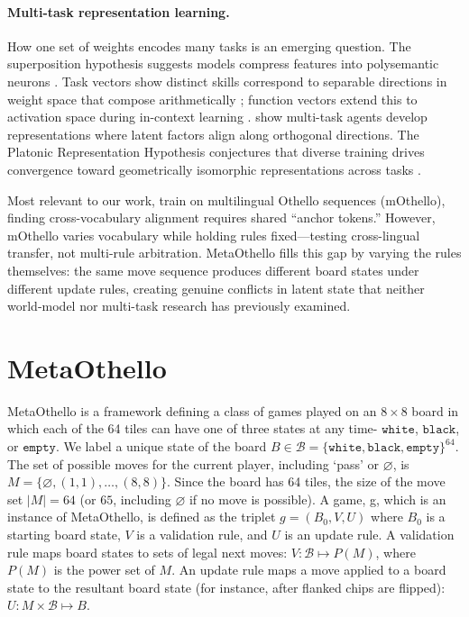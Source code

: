\documentclass{article}
\theoremstyle{plain}
\theoremstyle{definition}
\theoremstyle{remark}
\begin{document}
\paragraph{Multi-task representation learning.} How one set of weights encodes many tasks is an emerging question. The superposition hypothesis suggests models compress features into polysemantic neurons \cite{elhage_toy_2022}. Task vectors show distinct skills correspond to separable directions in weight space that compose arithmetically \cite{ilharco_editing_2023}; function vectors extend this to activation space during in-context learning \cite{todd_function_2024}. \citet{vafidis_disentangling_2025} show multi-task agents develop representations where latent factors align along orthogonal directions. The Platonic Representation Hypothesis conjectures that diverse training drives convergence toward geometrically isomorphic representations across tasks \cite{huh_platonic_2024}.

Most relevant to our work, \citet{hua_mothello_2024} train on multilingual Othello sequences (mOthello), finding cross-vocabulary alignment requires shared ``anchor tokens.'' However, mOthello varies vocabulary while holding rules fixed—testing cross-lingual transfer, not multi-rule arbitration. MetaOthello fills this gap by varying the rules themselves: the same move sequence produces different board states under different update rules, creating genuine conflicts in latent state that neither world-model nor multi-task research has previously examined.

\section{MetaOthello}
MetaOthello is a framework defining a class of games played on an $8 \times 8$ board in which each of the 64 tiles can have one of three states at any time- $\texttt{white}$, $\texttt{black}$, or $\texttt{empty}$. We label a unique state of the board $B \in \mathcal{B} = \{\texttt{white}, \texttt{black}, \texttt{empty}\}^{64}$. The set of possible moves for the current player, including `pass' or $\varnothing$, is $M = \{\varnothing, (1,1), \ldots, (8,8)\}$. Since the board has 64 tiles, the size of the move set $|M| = 64$ (or $65$, including $\varnothing$ if no move is possible). A game, g, which is an instance of MetaOthello, is defined as the triplet $g = (B_0, V, U)$
where $B_0$ is a starting board state, $V$ is a validation rule, and $U$ is an update rule. A validation rule maps board states to sets of legal next moves: $V : \mathcal{B} \mapsto P(M)$, where $P(M)$ is the power set of $M$. An update rule maps a move applied to a board state to the resultant board state (for instance, after flanked chips are flipped): $U : M \times \mathcal{B} \mapsto B.$
\end{document}
